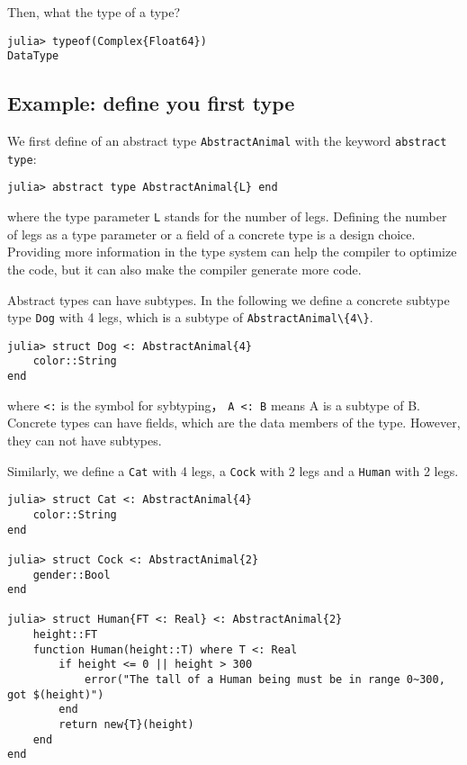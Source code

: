 \documentclass[
  notoc %
]{tufte-book}
\newcommand{\passthrough}[1]{#1}
\begin{document}
Then, what the type of a type?

\begin{lstlisting}
julia> typeof(Complex{Float64})
DataType
\end{lstlisting}

\hypertarget{example-define-you-first-type}{%
\subsection{Example: define you first
type}\label{example-define-you-first-type}}

We first define of an abstract type
\passthrough{\lstinline!AbstractAnimal!} with the keyword
\passthrough{\lstinline!abstract type!}:

\begin{lstlisting}
julia> abstract type AbstractAnimal{L} end
\end{lstlisting}

where the type parameter \passthrough{\lstinline!L!} stands for the
number of legs. Defining the number of legs as a type parameter or a
field of a concrete type is a design choice. Providing more information
in the type system can help the compiler to optimize the code, but it
can also make the compiler generate more code.

Abstract types can have subtypes. In the following we define a concrete
subtype type \passthrough{\lstinline!Dog!} with 4 legs, which is a
subtype of \passthrough{\lstinline!AbstractAnimal\{4\}!}.

\begin{lstlisting}
julia> struct Dog <: AbstractAnimal{4}
    color::String
end
\end{lstlisting}

where \passthrough{\lstinline!<:!} is the symbol for sybtyping，
\passthrough{\lstinline!A <: B!} means A is a subtype of B. Concrete
types can have fields, which are the data members of the type. However,
they can not have subtypes.

Similarly, we define a \passthrough{\lstinline!Cat!} with 4 legs, a
\passthrough{\lstinline!Cock!} with 2 legs and a
\passthrough{\lstinline!Human!} with 2 legs.

\begin{lstlisting}
julia> struct Cat <: AbstractAnimal{4}
    color::String
end

julia> struct Cock <: AbstractAnimal{2}
    gender::Bool
end

julia> struct Human{FT <: Real} <: AbstractAnimal{2}
    height::FT
    function Human(height::T) where T <: Real
        if height <= 0 || height > 300
            error("The tall of a Human being must be in range 0~300, got $(height)")
        end
        return new{T}(height)
    end
end
\end{lstlisting}
\end{document}
